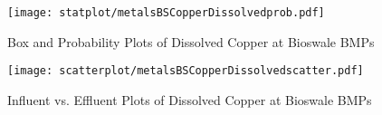         \begin{figure}[hb]   %
            \centering
            \texttt{[image: statplot/metalsBSCopperDissolvedprob.pdf]}
            \caption{Box and Probability Plots of Dissolved Copper at Bioswale BMPs}
        \end{figure}         %
        
        
        \begin{figure}[hb]   %
            \centering
            \texttt{[image: scatterplot/metalsBSCopperDissolvedscatter.pdf]}
            \caption{Influent vs. Effluent Plots of Dissolved Copper at Bioswale BMPs}
        \end{figure}         %
        \clearpage
        